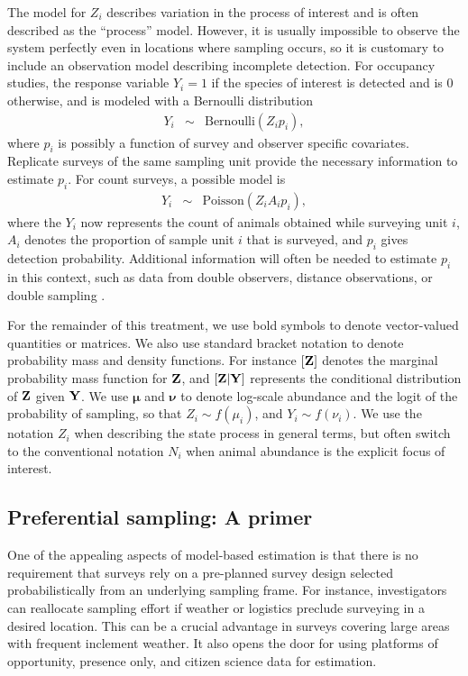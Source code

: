 \documentclass[times,mee,doublespace,]{besauth2}
\begin{document}
The model for $Z_i$ describes variation in the process of interest and is often described as the ``process'' model.  However, it is usually impossible to observe the system perfectly even in locations where sampling occurs, so it is customary to include an observation model describing incomplete detection.  For occupancy studies, the response variable $Y_i = 1$ if the species of interest is detected and is 0 otherwise, and is modeled with a Bernoulli distribution \citep{Royle2008}
\begin{eqnarray}
  Y_i & \sim & \text{Bernoulli}(Z_i p_i),
\end{eqnarray}
where $p_i$ is possibly a function of survey and observer specific covariates. Replicate surveys of the same sampling unit provide the necessary information to estimate $p_i$.   For count surveys, a possible model is
\begin{eqnarray}
  \label{eq:obs_pois}
  Y_i & \sim & \text{Poisson}(Z_i A_i p_i),
\end{eqnarray}
where the $Y_i$ now represents the count of animals obtained while surveying unit $i$, $A_i$ denotes the proportion of sample unit $i$ that is surveyed, and $p_i$ gives detection probability.  Additional information will often be needed to estimate $p_i$ in this context, such as data from double observers, distance observations, or double sampling \citep[see e.g.][]{BucklandEtAl2001,Royle2004,Borchers2006,ConnEtAl2014}.

For the remainder of this treatment, we use bold symbols to denote vector-valued quantities or matrices.  We also use standard bracket notation to denote probability mass and density functions.  For instance $[{\bf Z}]$ denotes the marginal probability mass function for ${\bf Z}$, and  $[{\bf Z}|{\bf Y}]$ represents the conditional distribution of ${\bf Z}$ given ${\bf Y}$.  We use $\boldsymbol{\mu}$ and $\boldsymbol{\nu}$ to denote log-scale abundance and the logit of the probability of sampling, so that $Z_i \sim f(\mu_i)$, and $Y_i \sim f(\nu_i)$.  We use the notation $Z_i$ when describing the state process in general terms, but often switch to the conventional notation $N_i$ when animal abundance is the explicit focus of interest.

\subsection{Preferential sampling: A primer}

One of the appealing aspects of model-based estimation is that there is no requirement that surveys rely on a pre-planned survey design selected probabilistically from an underlying sampling frame.  For instance, investigators can reallocate sampling effort if weather or logistics preclude surveying in a desired location.  This can be a crucial advantage in surveys covering large areas with frequent inclement weather.  It also opens the door for using platforms of opportunity, presence only, and citizen science data for estimation.
\end{document}
